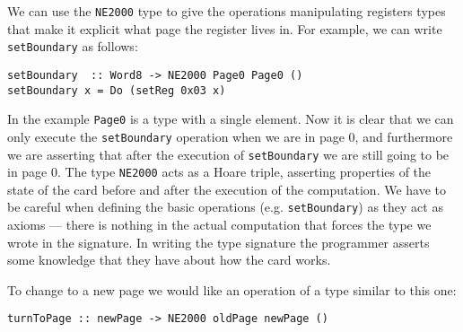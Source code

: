 \documentclass{article}
\begin{document}
We can use the \verb#NE2000# type to give the operations manipulating registers
types that make it explicit what page the register lives in.  
For example, we can write \verb#setBoundary# as follows:
\begin{verbatim}
setBoundary  :: Word8 -> NE2000 Page0 Page0 ()
setBoundary x = Do (setReg 0x03 x)
\end{verbatim}
In the example \verb#Page0# is a type with a single element.
Now it is clear that we can only execute the \verb#setBoundary# 
operation when we are in page 0, and furthermore we are asserting that 
after the execution of \verb#setBoundary# we are still going to be in page 0.  
The type \verb#NE2000# acts as a Hoare triple, asserting properties of the 
state of the card before and after the execution of the computation.
We have to be careful when defining the basic operations 
(e.g. \verb#setBoundary#) as they act as axioms --- there is nothing in the 
actual computation that forces the type we wrote in the signature.  
In writing the type signature the programmer asserts some knowledge that 
they have about how the card works.  

To change to a new page we would like an operation of a type similar to 
this one:
\begin{verbatim}
turnToPage :: newPage -> NE2000 oldPage newPage ()
\end{verbatim}
\end{document}
